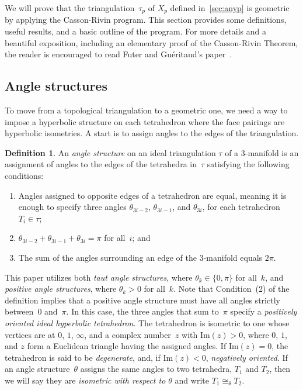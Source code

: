 \documentclass[reqno]{amsart}
\theoremstyle{plain}
\theoremstyle{definition}
\newtheorem{defn}{Definition}[section]
\begin{document}
We will prove that the triangulation~$\tau_{p}$ of $X_{p}$ defined in~\ref{sec:anyp} is geometric by applying the Casson-Rivin program.  This section provides some definitions,  useful results, and a basic outline of the program.  For more details and a beautiful exposition, including an elementary proof of the Casson-Rivin Theorem, the reader is encouraged to read Futer and Gu\'eritaud's paper~\cite{AngledtoHyperbolic}.


\subsection{Angle structures} \label{sec:definitions}  

To move from a topological triangulation to a geometric one, we need a way to impose a hyperbolic structure on each tetrahedron where the face pairings are hyperbolic isometries. A start is to assign angles to the edges of the triangulation.

\begin{defn}\label{def:anglestructure}
An \emph{angle structure} on an ideal triangulation $\tau$ of a 3-manifold is an assignment of angles to the edges of the tetrahedra in~$\tau$ satisfying the following conditions:
\begin{enumerate}
\item Angles assigned to opposite edges of a tetrahedron are equal, meaning it is enough to specify three angles $\theta_{3i-2}$, $\theta_{3i-1}$, and $\theta_{3i}$, for each tetrahedron~$T_i\in\tau$;
\item $\theta_{3i-2}+\theta_{3i-1}+\theta_{3i} = \pi$ for all~$i$; and
\item The sum of the angles surrounding an edge of the 3-manifold equals $2\pi$.
\end{enumerate}
\end{defn}

This paper utilizes both \emph{taut angle structures}, where $\theta_k\in\{0,\pi\}$ for all~$k$, and \emph{positive angle structures}, where $\theta_k>0$ for all~$k$.  Note that Condition~(2) of the definition implies that a positive angle structure must have all angles strictly between~0 and~$\pi$.  In this case, the three angles that sum to~$\pi$ specify a \emph{positively oriented ideal hyperbolic tetrahedron}.  The tetrahedron is isometric to one whose vertices are at $0$, $1$, $\infty$, and a complex number~$z$ with $\text{Im}(z)>0$, where $0$, $1$, and $z$ form a Euclidean triangle having the assigned angles.  If $\text{Im}(z)=0$, the tetrahedron is said to be \emph{degenerate}, and, if $\text{Im}(z)<0$, \emph{negatively oriented}.  If an angle structure~$\theta$ assigns the same angles to two tetrahedra, $T_1$ and $T_2$, then we will say they are \emph{isometric with respect to $\theta$} and write $T_1\cong_\theta T_2$.  
\end{document}

